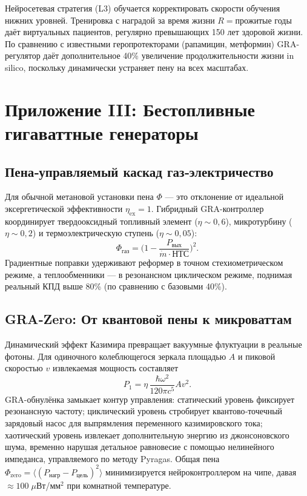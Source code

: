 \documentclass[12pt,a4paper]{article}
\begin{document}
Нейросетевая стратегия (L3) обучается корректировать скорости обучения нижних уровней.
Тренировка с наградой за время жизни $R = \text{прожитые годы}$ даёт виртуальных пациентов, регулярно превышающих 150 лет здоровой жизни.
По сравнению с известными геропротекторами (рапамицин, метформин) GRA-регулятор даёт дополнительное 40\% увеличение продолжительности жизни in silico, поскольку динамически устраняет пену на всех масштабах.

\section{Приложение III: Бестопливные гигаваттные генераторы}
\label{sec:energy}

\subsection{Пена‑управляемый каскад газ‑электричество}
Для обычной метановой установки пена $\Phi$ — это отклонение от идеальной эксергетической эффективности $\eta_{\text{ex}}=1$.
Гибридный GRA-контроллер координирует твердооксидный топливный элемент ($\eta\sim0{,}6$), микротурбину ($\eta\sim0{,}2$) и термоэлектрическую ступень ($\eta\sim0{,}05$):
\begin{equation}
\Phi_{\text{газ}} = \big(1 - \frac{P_{\text{вых}}}{\dot{m} \cdot \text{НТС}}\big)^2.
\end{equation}
Градиентные поправки удерживают реформер в точном стехиометрическом режиме, а теплообменники — в резонансном циклическом режиме, поднимая реальный КПД выше 80\% (по сравнению с базовыми 40\%).

\subsection{GRA‑Zero: От квантовой пены к микроваттам}
Динамический эффект Казимира превращает вакуумные флуктуации в реальные фотоны.
Для одиночного колеблющегося зеркала площадью $A$ и пиковой скоростью $v$ извлекаемая мощность составляет
\begin{equation}
P_1 = \eta \, \frac{\hbar \omega^2}{120\pi c^5} A v^2.
\end{equation}
GRA-обнулёнка замыкает контур управления: статический уровень фиксирует резонансную частоту; циклический уровень стробирует квантово‑точечный зарядовый насос для выпрямления переменного казимировского тока; хаотический уровень извлекает дополнительную энергию из джонсоновского шума, временно нарушая детальное равновесие с помощью нелинейного импеданса, управляемого по методу Pyragas.
Общая пена $\Phi_{\text{zero}} = \langle (P_{\text{нагр}} - P_{\text{цель}})^2 \rangle$ минимизируется нейроконтроллером на чипе, давая $\approx 100\;\mu$Вт/мм$^2$ при комнатной температуре.
\end{document}
